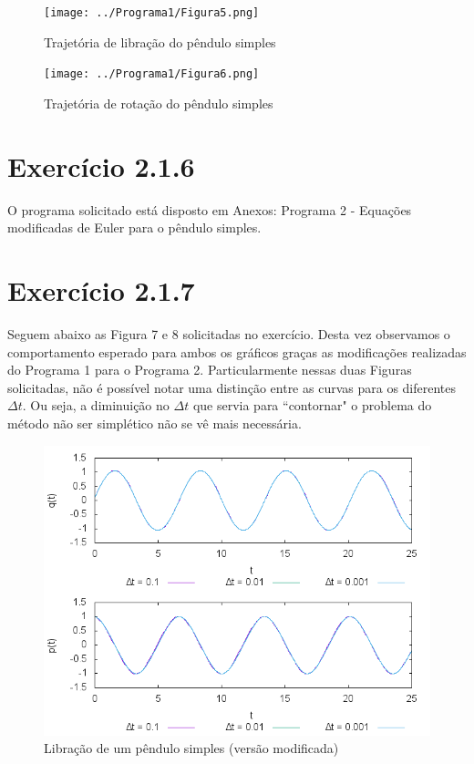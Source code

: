 \documentclass[a4paper,10pt]{article}
\begin{document}
\begin{figure}[H]
  \centering
  \texttt{[image: ../Programa1/Figura5.png]}
  \caption{Trajetória de libração do pêndulo simples}
\end{figure}

\begin{figure}[H]
  \centering
  \texttt{[image: ../Programa1/Figura6.png]}
  \caption{Trajetória de rotação do pêndulo simples}
\end{figure}

\section*{Exercício 2.1.6}
  O programa solicitado está disposto em Anexos: Programa 2 - Equações modificadas de Euler para o pêndulo simples.

\section*{Exercício 2.1.7}
  Seguem abaixo as Figura 7 e 8 solicitadas no exercício. Desta vez observamos o comportamento esperado para ambos
  os gráficos graças as modificações realizadas do Programa 1 para o Programa 2. Particularmente nessas duas Figuras
  solicitadas, não é possível notar uma distinção entre as curvas para os diferentes $\Delta t$. Ou seja, a diminuição
  no $\Delta t$ que servia para ``contornar" o problema do método não ser simplético não se vê mais necessária.


  \begin{figure}[H]
    \centering
    \includegraphics[scale=0.6]{../Programa2/Figura7.png}
    \caption{Libração de um pêndulo simples (versão modificada)}
  \end{figure}
\end{document}
